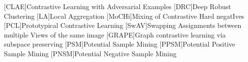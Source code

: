 \begin{acronym}

    [CLAE]{Contrastive Learning with Adversarial Examples}
    [DRC]{Deep Robust Clustering}
    [LA]{Local Aggregation}
    [MoCHi]{Mixing of Contrastive Hard negatIves}
    [PCL]{Prototypical Contrastive Learning}
    [SwAV]{Swapping Assignments between multiple Views of the same image}
    [GRAPE]{Graph contrastive learning via subspace preserving}
    [PSM]{Potential Sample Mining}
    [PPSM]{Potential Positive Sample Mining}
    [PNSM]{Potential Negative Sample Mining}

\end{acronym}